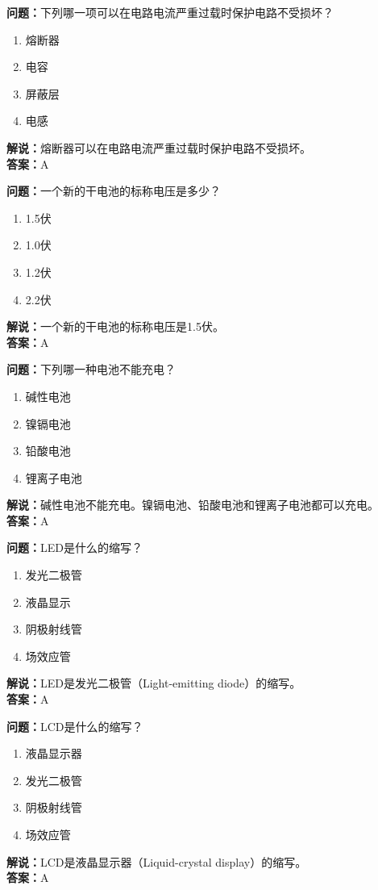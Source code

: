 \documentclass[UTF8]{ctexbook}
\begin{document}
\textbf{问题：}下列哪一项可以在电路电流严重过载时保护电路不受损坏？
\begin{enumerate}[label=\Alph*), leftmargin=3em]
  \item 熔断器
  \item 电容
  \item 屏蔽层
  \item 电感
\end{enumerate}
\textbf{解说：}熔断器可以在电路电流严重过载时保护电路不受损坏。\\
\textbf{答案：}A

\textbf{问题：}一个新的干电池的标称电压是多少？
\begin{enumerate}[label=\Alph*), leftmargin=3em]
  \item 1.5伏
  \item 1.0伏
  \item 1.2伏
  \item 2.2伏
\end{enumerate}
\textbf{解说：}一个新的干电池的标称电压是1.5伏。\\
\textbf{答案：}A

\textbf{问题：}下列哪一种电池不能充电？
\begin{enumerate}[label=\Alph*), leftmargin=3em]
  \item 碱性电池
  \item 镍镉电池
  \item 铅酸电池
  \item 锂离子电池
\end{enumerate}
\textbf{解说：}碱性电池不能充电。镍镉电池、铅酸电池和锂离子电池都可以充电。\\
\textbf{答案：}A

\textbf{问题：}LED是什么的缩写？
\begin{enumerate}[label=\Alph*), leftmargin=3em]
  \item 发光二极管
  \item 液晶显示
  \item 阴极射线管
  \item 场效应管
\end{enumerate}
\textbf{解说：}LED是发光二极管（Light-emitting diode）的缩写。\\
\textbf{答案：}A

\textbf{问题：}LCD是什么的缩写？
\begin{enumerate}[label=\Alph*), leftmargin=3em]
  \item 液晶显示器
  \item 发光二极管
  \item 阴极射线管
  \item 场效应管
\end{enumerate}
\textbf{解说：}LCD是液晶显示器（Liquid-crystal display）的缩写。\\
\textbf{答案：}A
\end{document}

